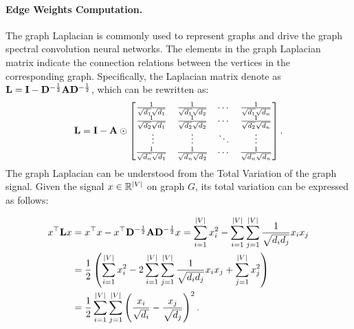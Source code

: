 \paragraph{Edge Weights Computation.}
The graph Laplacian is commonly used to represent graphs and drive the graph spectral convolution neural networks. 
The elements in the graph Laplacian matrix indicate the connection relations between the vertices in the corresponding graph. 
Specifically,
the Laplacian matrix denote as 
$\mathbf{L}  = \mathbf{I}-\mathbf{D}^{-\frac{1}{2}}\mathbf{A}\mathbf{D}^{-\frac{1}{2}}$, which can be rewritten as:
\begin{equation}
\mathbf{L} = \mathbf{I}- \mathbf{A} \odot
 \begin{bmatrix} \frac{1}{\sqrt{d_1}\sqrt{d_1}} & \frac{1}{\sqrt{d_1}\sqrt{d_2}} & \cdots & \frac{1}{\sqrt{d_1}\sqrt{d_n}} \\ \frac{1}{\sqrt{d_2}\sqrt{d_1}} & \frac{1}{\sqrt{d_2}\sqrt{d_2}} & \cdots & \frac{1}{\sqrt{d_2}\sqrt{d_n}}\\
\ \vdots & \vdots & \ddots & \vdots 
\\ \frac{1}{\sqrt{d_n}\sqrt{d_1}} & \frac{1}{\sqrt{d_n}\sqrt{d_2}} & \cdots & \frac{1}{\sqrt{d_n}\sqrt{d_n}} \end{bmatrix}.
\end{equation}
The graph Laplacian can be understood from the Total Variation of the graph signal. Given the signal $x\in \mathbb{R}^{|V|}$ on graph $G$, its total variation can be expressed as follows:  

\begin{equation}
\label{eq:laplacian_total_variance}
\begin{aligned}
    x^{\top} \mathbf{L} x&=x^{\top}  x-x^{\top} \mathbf{D}^{-\frac{1}{2}}\mathbf{A}\mathbf{D}^{-\frac{1}{2}} x 
    =\sum \limits _{i=1}^{|V|} x_{i}^{2}-\sum\limits_{i=1}^{|V|} \sum\limits_{j=1}^{|V|} \frac{1}{\sqrt{d_{i}d_j}}  x_{i} x_{j} \\
    &=\frac{1}{2}\left(\sum\limits_{i=1}^{|V|}  x_{i}^{2} -2 \sum\limits_{i=1}^{|V|} \sum\limits_{j=1}^{|V|} \frac{1}{\sqrt{d_{i} d_j}}  x_{i} x_{j}+\sum\limits_{j=1}^{|V|} x_{j}^{2}\right) \\
    &=\frac{1}{2} \sum\limits_{i=1}^{|V|} \sum\limits_{j=1}^{|V|}\left(\frac{x_{i}}{\sqrt{d_{i}}}-\frac{x_{j}}{\sqrt{d_{j}}}\right)^{2}.
\end{aligned}
\end{equation}

